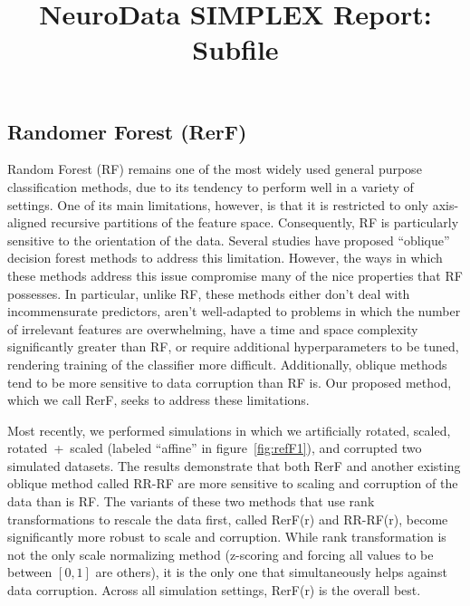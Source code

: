 \documentclass[simplex.tex]{subfiles}
\title{NeuroData SIMPLEX Report: Subfile}
\begin{document}

\subsection{Randomer Forest (RerF)}
Random Forest (RF) remains one of the most widely used general purpose
classification methods, due to its tendency to perform well in a variety of
settings. One of its main limitations, however, is that it is restricted to
only axis-aligned recursive partitions of the feature space. Consequently, RF
is particularly sensitive to the orientation of the data. Several studies have
proposed “oblique” decision forest methods to address this limitation. However,
the ways in which these methods address this issue compromise many of the nice
properties that RF possesses. In particular, unlike RF, these methods either
don’t deal with incommensurate predictors, aren’t well-adapted to problems in
which the number of irrelevant features are overwhelming, have a time and space
complexity significantly greater than RF, or require additional hyperparameters
to be tuned, rendering training of the classifier more difficult. Additionally,
oblique methods tend to be more sensitive to data corruption than RF is. Our
proposed method, which we call RerF, seeks to address these limitations. 	

Most recently, we performed simulations in which we artificially rotated,
scaled, 
rotated~+~scaled (labeled ``affine'' in figure~\ref{fig:refF1}), and corrupted two
simulated datasets. The results demonstrate that both RerF and another existing
oblique method called RR-RF are more sensitive to scaling and corruption of the
data than is RF. The variants of these two methods that use rank
transformations to rescale the data first, called RerF(r) and RR-RF(r), become
significantly more robust to scale and corruption. While rank transformation is
not the only scale normalizing method (z-scoring and forcing all values to be
between $[0,1]$ are others), it is the only one that simultaneously helps against
data corruption. Across all simulation settings, RerF(r) is the overall best.
\end{document}
